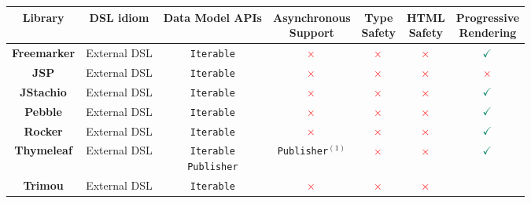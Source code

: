\begin{table}[h]
  \small
	\tabcolsep=0.1cm
	\def\arraystretch{1.2}
	\begin{tabular}{|c|c|c|c|c|c|c|}
		\hline                                                                  
		\textbf{Library}
		&\textbf{DSL idiom}
		&\textbf{Data Model APIs}
    &\shortstack{\textbf{Asynchronous}\\\textbf{Support}}
    &\shortstack{\textbf{Type}\\\textbf{Safety}}
    &\shortstack{\textbf{HTML}\\\textbf{Safety}}
		&\shortstack{\textbf{Progressive}\\\textbf{Rendering}}
		\\
		\hline
		\textbf{Freemarker}
		&External DSL
		&\texttt{Iterable}
		&\large{$\textcolor{red}{\times}$}
    &\large{$\textcolor{red}{\times}$}
    &\large{$\textcolor{red}{\times}$}
		&\large{$\textcolor{PineGreen}{\checkmark}$}
		\\
    \hline
		\textbf{JSP}
		&External DSL
		&\texttt{Iterable}
		&\large{$\textcolor{red}{\times}$}
    &\large{$\textcolor{red}{\times}$}
    &\large{$\textcolor{red}{\times}$}
		&\large{$\textcolor{red}{\times}$}
    \\
    \hline
		\textbf{JStachio}
		&External DSL
		&\texttt{Iterable}
		&\large{$\textcolor{red}{\times}$}
    &\large{$\textcolor{red}{\times}$}
    &\large{$\textcolor{red}{\times}$}
		&\large{$\textcolor{PineGreen}{\checkmark}$}
		\\\hline
		\textbf{Pebble}
		&External DSL
		&\texttt{Iterable}
		&\large{$\textcolor{red}{\times}$}
    &\large{$\textcolor{red}{\times}$}
    &\large{$\textcolor{red}{\times}$}
		&\large{$\textcolor{PineGreen}{\checkmark}$}
		\\
    \hline
		\textbf{Rocker}
		&External DSL
		&\texttt{Iterable}
		&\large{$\textcolor{red}{\times}$}
    &\large{$\textcolor{red}{\times}$}
    &\large{$\textcolor{red}{\times}$}
		&\large{$\textcolor{PineGreen}{\checkmark}$}
		\\
    \hline
		\textbf{Thymeleaf}
		&External DSL
		&\shortstack{\texttt{Iterable}\\\texttt{Publisher}}
		&\texttt{Publisher}$^{(1)}$
    &\large{$\textcolor{red}{\times}$}
    &\large{$\textcolor{red}{\times}$}
		&\large{$\textcolor{PineGreen}{\checkmark}$}
		\\
    \hline
		\textbf{Trimou}
		&External DSL
		&\texttt{Iterable}
		&\large{$\textcolor{red}{\times}$}
    &\large{$\textcolor{red}{\times}$}
    &\large{$\textcolor{red}{\times}$}

\end{tabular}
\end{table}
